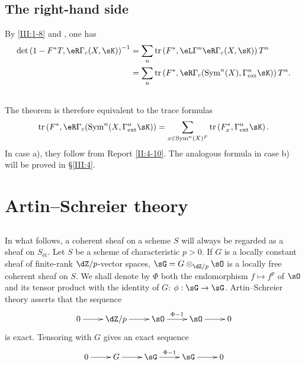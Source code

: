 \subsection{The right-hand side}\label{III:2-12}

By \ref{III:1-8} and \cite[XVII 5.5.12]{sga4}, one has
\begin{align*}
  \det\left(1-F^* T,\eR\Gamma_c(X,\sK)\right)^{-1}
    &= \sum_n \tr\left(F^*,\eL\Gamma^n\eR\Gamma_c(X,\sK)\right) T^n \\
    &= \sum_n \tr\left(F^*,\eR\Gamma_c(\operatorname{Sym}^n(X),\Gamma_\text{ext}^n\sK)\right) T^n \text{.}
\end{align*}






\subsection{}\label{III:2-13}

The theorem is therefore equivalent to the trace formulas
\[
  \tr\left(F^*,\eR\Gamma_c(\operatorname{Sym}^n(X,\Gamma_\text{ext}^n \sK)\right) = \sum_{x\in\operatorname{Sym}^n(X)^F} \tr\left(F_x^*,\Gamma_\text{ext}^n\sK\right) \text{.}
\]
In case a), they follow from Report \ref{II:4-10}. The analogous formula in
case b) will be proved in \S\ref{III:4}.










\section{Artin--Schreier theory}\label{III:3}






\subsection{}\label{III:3-1}

In what follows, a coherent sheaf on a scheme $S$ will always be regarded as
a sheaf on $S_\text{ét}$. Let $S$ be a scheme of characteristic $p>0$. If
$G$ is a locally constant sheaf of finite-rank $\dZ/p$-vector spaces,
$\sG=G\otimes_{\dZ/p}\sO$ is a locally free coherent sheaf on $S$. We shall
denote by $\Phi$ both the endomorphism $f\mapsto f^p$ of $\sO$ and its tensor
product with the identity of $G$: $\phi:\sG\to\sG$. Artin--Schreier theory
\cite[IX 3.5]{sga4} asserts that the sequence
\[\xymatrix{
  0 \ar[r]
    & \dZ/p \ar[r]
    & \sO \ar[r]^-{\Phi-1}
    & \sO \ar[r]
    & 0
}\]
is exact. Tensoring with $G$ gives an exact sequence
\[\xymatrix{
  0 \ar[r]
    & G \ar[r]
    & \sG \ar[r]^-{\Phi-1}
    & \sG \ar[r]
    & 0
}\]






